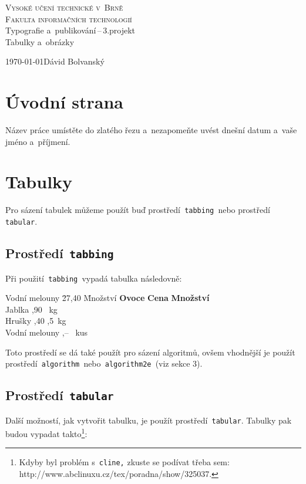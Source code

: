 \documentclass[a4paper,11pt,titlepage]{article}
\begin{document}
	\begin{titlepage}
		\begin{center}
			{\Huge\textsc{Vysoké učení technické v~Brně}}\\
			\vspace{+0.8em}
			{\huge\textsc{Fakulta informačních technologií}}\\
			\bigskip
			\LARGE{Typografie a~publikování\,--\,3.projekt}\\
			\vspace{-0.25em}
			\Huge{Tabulky a~obrázky}
		\end{center}
		{\Large \today \hfill Dávid Bolvanský}
	\end{titlepage}


\newpage
\pagestyle{plain}
\section{Úvodní strana}
	Název práce umístěte do zlatého řezu a~nezapomeňte uvést dnešní datum a~vaše jméno a~příjmení.

\section{Tabulky}
	Pro sázení tabulek můžeme použít buď prostředí\texttt{ tabbing }nebo prostředí\texttt{ tabular}.

	\subsection{Prostředí\texttt{ tabbing }}
		Při použití\texttt{ tabbing }vypadá tabulka následovně:
		\begin{tabbing}
			
			Vodní melouny \quad \= 27,40 \quad \= Množství \kill
			\textbf{Ovoce} \> \textbf{Cena} \> \textbf{Množství}\\
				Jablka ,90 \ kg\\
				Hrušky ,40 ,5\ kg\\
				Vodní melouny ,-- \ kus\\
		\end{tabbing}
		
		\noindent Toto prostředí se dá také použít pro sázení algoritmů, ovšem vhodnější je použít prostředí\texttt{ algorithm }nebo\texttt{ algorithm2e }(viz sekce 3).
	
	\subsection{Prostředí\texttt{ tabular}}
	Další možností, jak vytvořit tabulku, je použít prostředí\texttt{ tabular}. Tabulky pak budou
vypadat takto\footnote{Kdyby byl problém s\texttt{ cline,} zkuste se podívat třeba sem:
http://www.abclinuxu.cz/tex/poradna/show/325037.}:
\end{document}
